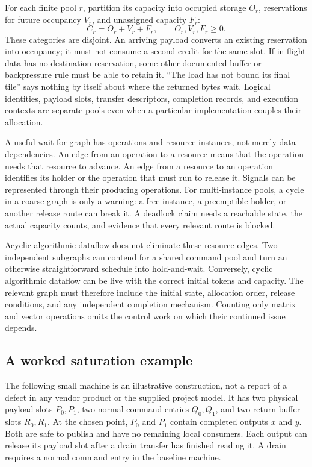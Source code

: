 For each finite pool $r$, partition its capacity into occupied storage $O_r$, reservations for future occupancy $V_r$, and unassigned capacity $F_r$:
\begin{equation}
 C_r=O_r+V_r+F_r,\qquad O_r,V_r,F_r\geq 0.
 \label{eq:u008-capacity}
\end{equation}
These categories are disjoint. An arriving payload converts an existing reservation into occupancy; it must not consume a second credit for the same slot. If in-flight data has no destination reservation, some other documented buffer or backpressure rule must be able to retain it. ``The load has not bound its final tile'' says nothing by itself about where the returned bytes wait. Logical identities, payload slots, transfer descriptors, completion records, and execution contexts are separate pools even when a particular implementation couples their allocation.

A useful wait-for graph has operations and resource instances, not merely data dependencies. An edge from an operation to a resource means that the operation needs that resource to advance. An edge from a resource to an operation identifies its holder or the operation that must run to release it. Signals can be represented through their producing operations. For multi-instance pools, a cycle in a coarse graph is only a warning: a free instance, a preemptible holder, or another release route can break it. A deadlock claim needs a reachable state, the actual capacity counts, and evidence that every relevant route is blocked.

Acyclic algorithmic dataflow does not eliminate these resource edges. Two independent subgraphs can contend for a shared command pool and turn an otherwise straightforward schedule into hold-and-wait. Conversely, cyclic algorithmic dataflow can be live with the correct initial tokens and capacity. The relevant graph must therefore include the initial state, allocation order, release conditions, and any independent completion mechanism. Counting only matrix and vector operations omits the control work on which their continued issue depends.

\subsection{A worked saturation example}
\label{sec:u008-example}

The following small machine is an illustrative construction, not a report of a defect in any vendor product or the supplied project model. It has two physical payload slots $P_0,P_1$, two normal command entries $Q_0,Q_1$, and two return-buffer slots $R_0,R_1$. At the chosen point, $P_0$ and $P_1$ contain completed outputs $x$ and $y$. Both are safe to publish and have no remaining local consumers. Each output can release its payload slot after a drain transfer has finished reading it. A drain requires a normal command entry in the baseline machine.

